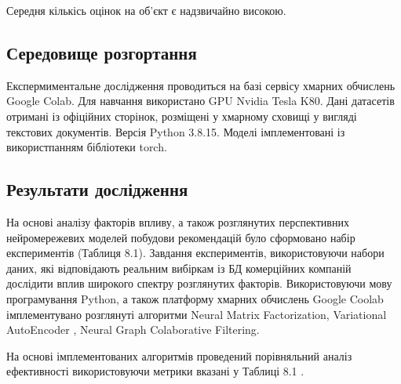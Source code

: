 Середня кількісь оцінок на об’єкт є надзвичайно високою.
\subsection{Середовище розгортання}

Експермиментальне дослідження проводиться на базі сервісу хмарних обчислень  Google Colab. Для навчання використано GPU Nvidia Tesla K80. Дані датасетів отримані із офіційних сторінок, розміщені у хмарному сховищі у вигляді текстових документів. Версія Python 3.8.15. Моделі імплементовані із використпанням бібліотеки torch. 


\subsection{Результати дослідження}
На основі аналізу факторів впливу, а також розглянутих перспективних нейромережевих моделей побудови рекомендацій було сформовано набір експериментів (Таблиця 8.1). Завдання експериментів, використовуючи набори даних, які відповідають реальним вибіркам із БД комерційних компаній дослідити вплив широкого спектру розглянутих факторів. Використовуючи мову програмування Python, а також платформу хмарних обчислень Google Coolab імплементувано розглянуті алгоритми Neural Matrix Factorization, Variational AutoEncoder ,  Neural Graph Colaborative Filtering.

На основі імплементованих алгоритмів проведений порівняльний аналіз ефективності використовуючи метрики вказані у Таблиці 8.1 . 

